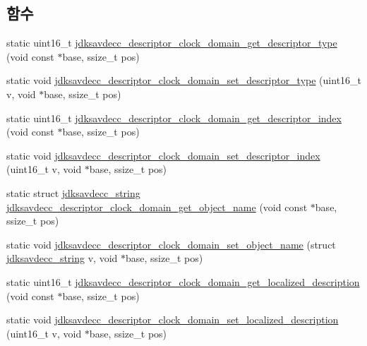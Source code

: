 \subsection*{함수}
\begin{DoxyCompactItemize}
\item 
static uint16\+\_\+t \hyperlink{group__descriptor__clock__domain_gab5660321110c3f80925fbb8cf3a686c9}{jdksavdecc\+\_\+descriptor\+\_\+clock\+\_\+domain\+\_\+get\+\_\+descriptor\+\_\+type} (void const $\ast$base, ssize\+\_\+t pos)
\item 
static void \hyperlink{group__descriptor__clock__domain_ga383281f4f9c0b0835132e69a7a48eb55}{jdksavdecc\+\_\+descriptor\+\_\+clock\+\_\+domain\+\_\+set\+\_\+descriptor\+\_\+type} (uint16\+\_\+t v, void $\ast$base, ssize\+\_\+t pos)
\item 
static uint16\+\_\+t \hyperlink{group__descriptor__clock__domain_ga8de4e3c350af50630aa21b69890ea87e}{jdksavdecc\+\_\+descriptor\+\_\+clock\+\_\+domain\+\_\+get\+\_\+descriptor\+\_\+index} (void const $\ast$base, ssize\+\_\+t pos)
\item 
static void \hyperlink{group__descriptor__clock__domain_ga3867eb3d325993605e4081467f9c7c36}{jdksavdecc\+\_\+descriptor\+\_\+clock\+\_\+domain\+\_\+set\+\_\+descriptor\+\_\+index} (uint16\+\_\+t v, void $\ast$base, ssize\+\_\+t pos)
\item 
static struct \hyperlink{structjdksavdecc__string}{jdksavdecc\+\_\+string} \hyperlink{group__descriptor__clock__domain_gaf64ca84e3bbb2c9f4592d07b0f4d817e}{jdksavdecc\+\_\+descriptor\+\_\+clock\+\_\+domain\+\_\+get\+\_\+object\+\_\+name} (void const $\ast$base, ssize\+\_\+t pos)
\item 
static void \hyperlink{group__descriptor__clock__domain_gaaeb3b6b3d510700bb2a322b856241a04}{jdksavdecc\+\_\+descriptor\+\_\+clock\+\_\+domain\+\_\+set\+\_\+object\+\_\+name} (struct \hyperlink{structjdksavdecc__string}{jdksavdecc\+\_\+string} v, void $\ast$base, ssize\+\_\+t pos)
\item 
static uint16\+\_\+t \hyperlink{group__descriptor__clock__domain_gab5efd01d176fcf2fa9ce3d28d18da8e6}{jdksavdecc\+\_\+descriptor\+\_\+clock\+\_\+domain\+\_\+get\+\_\+localized\+\_\+description} (void const $\ast$base, ssize\+\_\+t pos)
\item 
static void \hyperlink{group__descriptor__clock__domain_ga5994a25475af83356f0aacfde38bee4c}{jdksavdecc\+\_\+descriptor\+\_\+clock\+\_\+domain\+\_\+set\+\_\+localized\+\_\+description} (uint16\+\_\+t v, void $\ast$base, ssize\+\_\+t pos)
\item 

\end{DoxyCompactItemize}
